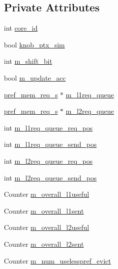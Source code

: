 \subsection*{Private Attributes}
\begin{DoxyCompactItemize}
\item 
int \hyperlink{classhwp__common__c_afe4085ac88e7260e21e8ef746ad037ea}{core\_\-id}
\item 
bool \hyperlink{classhwp__common__c_a7feb683e634fd5c3687b7373a9765be0}{knob\_\-ptx\_\-sim}
\item 
int \hyperlink{classhwp__common__c_ad38f322721c4ef2c6d2780966c726b03}{m\_\-shift\_\-bit}
\item 
bool \hyperlink{classhwp__common__c_abf0978a3089ddcee91a153cd2bb547bc}{m\_\-update\_\-acc}
\item 
\hyperlink{structpref__mem__req__s}{pref\_\-mem\_\-req\_\-s} $\ast$ \hyperlink{classhwp__common__c_a77746bacd00943b3f0b05c01cab47c08}{m\_\-l1req\_\-queue}
\item 
\hyperlink{structpref__mem__req__s}{pref\_\-mem\_\-req\_\-s} $\ast$ \hyperlink{classhwp__common__c_ade1174fd9f09001b7805398b7f18c03b}{m\_\-l2req\_\-queue}
\item 
int \hyperlink{classhwp__common__c_a4ff579785f41d6cd50b9f7d3dfb53eda}{m\_\-l1req\_\-queue\_\-req\_\-pos}
\item 
int \hyperlink{classhwp__common__c_a8a2d2e563385b7af4694888f96902bdc}{m\_\-l1req\_\-queue\_\-send\_\-pos}
\item 
int \hyperlink{classhwp__common__c_a255f0b4bdf74ba9042cdae97f7b43965}{m\_\-l2req\_\-queue\_\-req\_\-pos}
\item 
int \hyperlink{classhwp__common__c_ac0fae9f4b6721765278811d618eb9629}{m\_\-l2req\_\-queue\_\-send\_\-pos}
\item 
Counter \hyperlink{classhwp__common__c_af23abcaf04aa6842a3a083d085ee1c37}{m\_\-overall\_\-l1useful}
\item 
Counter \hyperlink{classhwp__common__c_a3339e0c2bdd7d61b8149690b266e4756}{m\_\-overall\_\-l1sent}
\item 
Counter \hyperlink{classhwp__common__c_a54101466f7f886b6650aef05b6e4bcd3}{m\_\-overall\_\-l2useful}
\item 
Counter \hyperlink{classhwp__common__c_ab819b7205b88fe7311e2b95667cd2410}{m\_\-overall\_\-l2sent}
\item 
Counter \hyperlink{classhwp__common__c_aba0eb14ce388c2843221e3f642a580f6}{m\_\-num\_\-uselesspref\_\-evict}
\item 

\end{DoxyCompactItemize}
